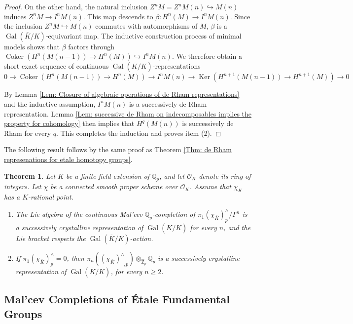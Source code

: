 \documentclass[11pt]{amsart}
\newtheorem{theorem}{Theorem}[section]
\theoremstyle{definition}
\numberwithin{equation}{section}
\numberwithin{equation}{section}
\newcommand\QQ{\mathbb{Q}}
\newcommand\ZZ{\mathbb{Z}}
\DeclareMathOperator{\Ker}{Ker}
\DeclareMathOperator{\Coker}{Coker}
\DeclareMathOperator{\et}{\acute{e}t}
\DeclareMathOperator{\Gal}{Gal}
\begin{document}
\begin{proof}
On the other hand, the natural inclusion $Z^nM=Z^nM(n)\hookrightarrow M(n)$ induces $Z^nM\rightarrow I^nM(n)$. This map descends to $\beta: H^n(M)\rightarrow I^nM(n)$. Since the inclusion $Z^nM\hookrightarrow M(n)$ commutes with automorphisms of $M$, $\beta$ is a $\Gal(\overline{K}/K)$-equivariant map. 
The inductive construction process of minimal models shows that $\beta$ factors through $\Coker(H^n(M(n-1))\rightarrow H^n(M))\hookrightarrow I^nM(n)$. We therefore obtain a short exact sequence of continuous $\Gal(\overline{K}/K)$-representations 
\[
0\rightarrow \Coker(H^n(M(n-1))\rightarrow H^n(M))\rightarrow I^nM(n)\rightarrow \Ker(H^{n+1}(M(n-1))\rightarrow H^{n+1}(M))\rightarrow 0
\]

By Lemma \ref{Lem: Closure of algebraic operations of de Rham representations} and the inductive assumption, $I^nM(n)$ is a successively de Rham representation. Lemma \ref{Lem: successive de Rham on indecomposables implies the property for cohomology} then implies that $H^q(M(n))$ is successively de Rham for every $q$. This completes the induction and proves item (2). 
\end{proof}

The following result follows by the same proof as Theorem \ref{Thm: de Rham represenations for etale homotopy groups}.

\begin{theorem}\label{Thm: crystalline represenations for etale homotopy groups}
Let $K$ be a finite field extension of $\QQ_{p}$, and let $\mathcal{O}_{K}$ denote its ring of integers. Let $\chi$ be a connected smooth proper scheme over $\mathcal{O}_K$. Assume that $\chi_{K}$ has a $K$-rational point. 
\begin{enumerate}[leftmargin=0.25in]
    \item The Lie algebra of the continuous Mal'cev $\QQ_p$-completion of $\pi^{\et}_1(\chi_{\overline{K}})^{\wedge}_{p}/\Gamma^n$ is a successively crystalline representation of $\Gal(\overline{K}/K)$ for every $n$, and the Lie bracket respects the $\Gal(\overline{K}/K)$-action.
    \item If $\pi^{\et}_1(\chi_{\overline{K}})^{\wedge}_{p}=0$, then $\pi_n((\chi_{\overline{K}})^{\wedge}_{\et,p})\otimes_{\widehat{\ZZ}_{p}}\QQ_{p}$ is a successively crystalline representation of $\Gal(\overline{K}/K)$, for every $n\geq 2$.
\end{enumerate}
\end{theorem}

\subsection{Mal'cev Completions of \'Etale Fundamental Groups}\,
\end{document}
